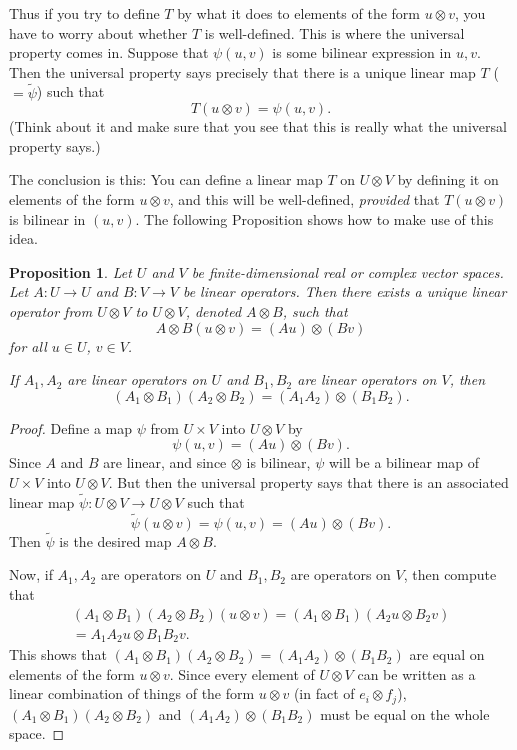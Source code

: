\documentclass[12pt]{amsbook}
\theoremstyle{plain}
\newtheorem{proposition}[theorem]{Proposition}
\numberwithin{equation}{chapter}
\numberwithin{theorem}{chapter}
\begin{document}
Thus if you try to define $T$ by what it does to elements of the form
$u\otimes v$, you have to worry about whether $T$ is well-defined. This is
where the universal property comes in. Suppose that $\psi(u,v)$ is some
bilinear expression in $u,v$. Then the universal property says precisely that
there is a unique linear map $T$ ($=\widetilde{\psi}$) such that
\[
T(u\otimes v)=\psi(u,v)\text{.}%
\]
(Think about it and make sure that you see that this is really what the
universal property says.)

The conclusion is this: You can define a linear map $T$ on $U\otimes V$ by
defining it on elements of the form $u\otimes v$, and this will be
well-defined, \textit{provided} that $T(u\otimes v)$ is bilinear in $(u,v)$.
The following Proposition shows how to make use of this idea.

\begin{proposition}
Let $U$ and $V$ be finite-dimensional real or complex vector spaces. Let
$A:U\rightarrow U$ and $B:V\rightarrow V$ be linear operators. Then there
exists a unique linear operator from $U\otimes V$ to $U\otimes V$, denoted
$A\otimes B$, such that
\[
A\otimes B(u\otimes v)=\left(  Au\right)  \otimes\left(  Bv\right)
\]
for all $u\in U$, $v\in V$.

If $A_{1},A_{2}$ are linear operators on $U$ and $B_{1},B_{2}$ are linear
operators on $V$, then
\[
\left(  A_{1}\otimes B_{1}\right)  \left(  A_{2}\otimes B_{2}\right)  =\left(
A_{1}A_{2}\right)  \otimes\left(  B_{1}B_{2}\right)  \text{.}%
\]
\end{proposition}

\begin{proof}
Define a map $\psi$ from $U\times V$ into $U\otimes V$ by
\[
\psi(u,v)=\left(  Au\right)  \otimes\left(  Bv\right)  \text{.}%
\]
Since $A$ and $B$ are linear, and since $\otimes$ is bilinear, $\psi$ will be
a bilinear map of $U\times V$ into $U\otimes V$. But then the universal
property says that there is an associated linear map $\widetilde{\psi
}:U\otimes V\rightarrow U\otimes V$ such that
\[
\widetilde{\psi}(u\otimes v)=\psi(u,v)=\left(  Au\right)  \otimes\left(
Bv\right)  \text{.}%
\]
Then $\widetilde{\psi}$ is the desired map $A\otimes B$.

Now, if $A_{1},A_{2}$ are operators on $U$ and $B_{1},B_{2}$ are operators on
$V$, then compute that
\begin{align*}
\left(  A_{1}\otimes B_{1}\right)  \left(  A_{2}\otimes B_{2}\right)
(u\otimes v)=\left(  A_{1}\otimes B_{1}\right)  \left(  A_{2}u\otimes
B_{2}v\right)  \\
=A_{1}A_{2}u\otimes B_{1}B_{2}v\text{.}%
\end{align*}
This shows that $\left(  A_{1}\otimes B_{1}\right)  \left(  A_{2}\otimes
B_{2}\right)  =\left(  A_{1}A_{2}\right)  \otimes\left(  B_{1}B_{2}\right)  $
are equal on elements of the form $u\otimes v$. Since every element of
$U\otimes V$ can be written as a linear combination of things of the form
$u\otimes v$ (in fact of $e_{i}\otimes f_{j}$), $\left(  A_{1}\otimes
B_{1}\right)  \left(  A_{2}\otimes B_{2}\right)  $ and $\left(  A_{1}%
A_{2}\right)  \otimes\left(  B_{1}B_{2}\right)  $ must be equal on the whole space.
\end{proof}
\end{document}
